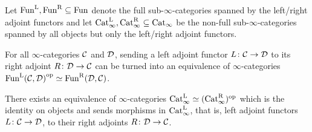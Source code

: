 \begin{cor}\label{cor:ExtractingAdjoints}
	Let $\operatorname{Fun}^{\mathrm{L}},\operatorname{Fun}^{\mathrm{R}}\subseteq \operatorname{Fun}$ denote the full sub-$\infty$-categories spanned by the left/right adjoint functors and let $\mathrm{Cat}_\infty^{\mathrm{L}},\mathrm{Cat}_\infty^{\mathrm{R}}\subseteq \mathrm{Cat}_\infty$ be the non-full sub-$\infty$-categories  spanned by all objects but only the left/right adjoint functors.
	\begin{alphanumerate}
		\item For all $\infty$-categories $\mathcal{C}$ and $\mathcal{D}$, sending a left adjoint functor $L\colon \mathcal{C}\rightarrow \mathcal{D}$ to its right adjoint $R\colon \mathcal{D}\rightarrow \mathcal{C}$ can be turned into an equivalence of $\infty$-categories $\operatorname{Fun}^{\mathrm{L}}\!\left(\mathcal{C},\mathcal{D}\right)^{\mathrm{op}}\simeq \operatorname{Fun}^{\mathrm{R}}\!\left(\mathcal{D},\mathcal{C}\right)$.\label{enum:FunLFunR}
		\item \!There exists an equivalence of $\infty$-categories $\mathrm{Cat}_\infty^{\mathrm{L}}\simeq (\mathrm{Cat}_\infty^{\mathrm{R}})^{\mathrm{op}}$ which is the identity on objects and sends morphisms in $\mathrm{Cat}_\infty^{\mathrm{L}}$, that is, left adjoint functors $L\colon \mathcal{C}\rightarrow \mathcal{D}$, to their right adjoints $R\colon \mathcal{D}\rightarrow \mathcal{C}$.\label{enum:CatLCatR}
	\end{alphanumerate}
\end{cor}
